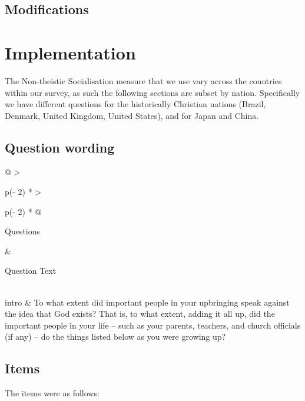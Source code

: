\documentclass[
  letterpaper,
]{scrbook}
\begin{document}
\subsection*{Modifications}\label{modifications-5}

\section{Implementation}\label{implementation-5}

The Non-theistic Socialisation measure that we use vary across the
countries within our survey, as such the following sections are subset
by nation. Specifically we have different questions for the historically
Christian nations (Brazil, Denmark, United Kingdom, United States), and
for Japan and China.

\subsection*{Question wording}\label{question-wording-5}

\begin{longtable}[]{@{}
  >{\raggedright\arraybackslash}p{(\columnwidth - 2\tabcolsep) * }
  >{\raggedright\arraybackslash}p{(\columnwidth - 2\tabcolsep) * }@{}}
\toprule\noalign{}
\begin{minipage}[b]{\linewidth}\raggedright
Questions
\end{minipage} & \begin{minipage}[b]{\linewidth}\raggedright
Question Text
\end{minipage} \\
\midrule\noalign{}
\endhead
\bottomrule\noalign{}
\endlastfoot
intro & To what extent did important people in your upbringing speak
against the idea that God exists? That is, to what extent, adding it all
up, did the important people in your life -- such as your parents,
teachers, and church officials (if any) -- do the things listed below as
you were growing up? \\
\end{longtable}

\subsection*{Items}\label{items-5}

The items were as follows:
\end{document}

